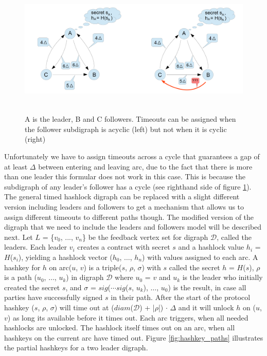 
\begin{figure}[h]
	\includegraphics[height=6.5cm]{timeouts_subdigraph}	%
	\caption{A is the leader, B and C followers. Timeouts can be assigned when the follower subdigraph is acyclic (left) but not when it is cyclic (right)}
	\label{fig:timeouts_subdigraph}
\end{figure}

Unfortunately we have to assign timeouts across a cycle that guarantees a gap of at least $\Delta$ between entering and leaving arc, due to the fact that there is more than one leader this formular does not work in this case. This is because the subdigraph of any leader's follower has a cycle (see righthand side of figure \ref{fig:timeouts_subdigraph}). The general timed hashlock digraph can be replaced with a slight different version including leaders and followers to get a mechanism that allows us to assign different timeouts to different paths though. The modified version of the digraph that we need to include the leaders and followers model will be described next. Let $L$ = \{$v_0$, ..., $v_n$\} be the feedback vertex set for digraph $\mathcal{D}$, called the leaders. Each leader $v_i$ creates a contract with secret $s$ and a hashlock value $h_i$ = $H$($s_i$), yielding a hashlock vector ($h_0$, $\dots$, $h_n$) with values assigned to each arc. A hashkey for $h$ on arc($u$, $v$) is a triple($s$, $\rho$, $\sigma$) with $s$ called the secret $h$ = $H$($s$), $\rho$ is a path ($u_0$, $\dots$, $u_k$) in digraph $\mathcal{D}$ where $u_0$ = $v$ and $u_k$ is the leader who initially created the secret $s$, and $\sigma$ = $sig$($\cdots$$sig$($s$, $u_k$), $\dots$, $u_0$) is the result, in case all parties have successfully signed $s$ in their path. After the start of the protocol hashkey ($s$, $\rho$, $\sigma$) will time out at ($diam$($\mathcal{D}$) + |$\rho$|) $\cdot$ $\Delta$ and it will unlock $h$ on ($u$, $v$) as long its available before it times out. Each arc triggers, when all needed hashlocks are unlocked. The hashlock itself times out on an arc, when all hashkeys on the current arc have timed out. Figure \ref{fig:hashkey_paths} illustrates the partial hashkeys for a two leader digraph.

